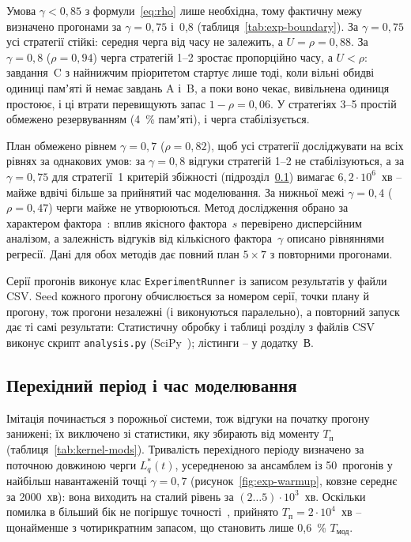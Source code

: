 Умова $\gamma < 0{,}85$ з формули~\eqref{eq:rho} лише необхідна, тому фактичну межу визначено
прогонами за $\gamma = 0{,}75$ і~0,8 (таблиця~\ref{tab:exp-boundary}). За $\gamma = 0{,}75$ усі
стратегії стійкі: середня черга від часу не залежить, а $U = \rho = 0{,}88$. За $\gamma = 0{,}8$
($\rho = 0{,}94$) черга стратегій 1--2 зростає пропорційно часу, а $U < \rho$: завдання~C з
найнижчим пріоритетом стартує лише тоді, коли вільні обидві одиниці памʼяті й немає завдань A
і~B, а поки воно чекає, вивільнена одиниця простоює, і ці втрати перевищують запас
$1 - \rho = 0{,}06$. У стратегіях 3--5 простій обмежено резервуванням (4~\% памʼяті), і черга
стабілізується.



План обмежено рівнем $\gamma = 0{,}7$ ($\rho = 0{,}82$), щоб усі стратегії досліджувати на всіх
рівнях за однакових умов: за $\gamma = 0{,}8$ відгуки стратегій 1--2 не стабілізуються, а за
$\gamma = 0{,}75$ для стратегії~1 критерій збіжності (підрозділ~\ref{sec:exp-warmup}) вимагає
$6{,}2\cdot10^6$~хв -- майже вдвічі більше за прийнятий час моделювання. За нижньої межі
$\gamma = 0{,}4$ ($\rho = 0{,}47$) черги майже не утворюються. Метод дослідження обрано за
характером фактора~\cite{stetsenko-kursova}: вплив якісного фактора~$s$ перевірено дисперсійним
аналізом, а залежність відгуків від кількісного фактора~$\gamma$ описано рівняннями регресії.
Дані для обох методів дає повний план $5 \times 7$ з повторними прогонами.

Серії прогонів виконує клас \texttt{ExperimentRunner} із
записом результатів у файли CSV. Seed кожного прогону обчислюється за номером серії, точки плану
й прогону, тож прогони незалежні (і виконуються паралельно), а повторний запуск дає ті самі
результати:
Статистичну обробку і таблиці розділу з файлів CSV виконує скрипт \texttt{analysis.py}
(SciPy~\cite{scipy}); лістинги -- у додатку~В.

\subsection{Перехідний період і час моделювання}\label{sec:exp-warmup}

Імітація починається з порожньої системи, тож відгуки на початку прогону занижені; їх
виключено зі статистики, яку збирають від моменту $T_{\text{п}}$ (таблиця~\ref{tab:kernel-mods}).
Тривалість перехідного періоду визначено за поточною довжиною черги $L_q^*(t)$, усередненою за
ансамблем із 50~прогонів у найбільш навантаженій точці $\gamma = 0{,}7$
(рисунок~\ref{fig:exp-warmup}, ковзне середнє за 2000~хв): вона виходить на сталий рівень за
$(2\ldots5)\cdot10^3$~хв. Оскільки помилка в більший бік не погіршує точності~\cite{stetsenko-kursova},
прийнято $T_{\text{п}} = 2\cdot10^4$~хв -- щонайменше з чотирикратним запасом, що становить лише 0,6~\% $T_{\text{мод}}$.

